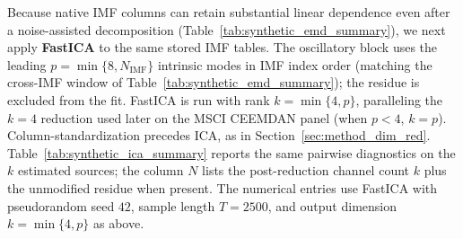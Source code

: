 \documentclass[11pt,a4paper]{article}
\begin{document}
Because native IMF columns can retain substantial linear dependence even after a noise-assisted decomposition (Table~\ref{tab:synthetic_emd_summary}), we next apply \textbf{FastICA} \citep{hyvarinen2000independent} to the same stored IMF tables. The oscillatory block uses the leading $p=\min\{8,N_{\mathrm{IMF}}\}$ intrinsic modes in IMF index order (matching the cross-IMF window of Table~\ref{tab:synthetic_emd_summary}); the residue is excluded from the fit. FastICA is run with rank $k=\min\{4,p\}$, paralleling the $k=4$ reduction used later on the MSCI CEEMDAN panel (when $p<4$, $k=p$). Column-standardization precedes ICA, as in Section~\ref{sec:method_dim_red}. Table~\ref{tab:synthetic_ica_summary} reports the same pairwise diagnostics on the $k$ estimated sources; the column $N$ lists the post-reduction channel count $k$ plus the unmodified residue when present. The numerical entries use FastICA with pseudorandom seed $42$, sample length $T=2500$, and output dimension $k=\min\{4,p\}$ as above.
\end{document}
